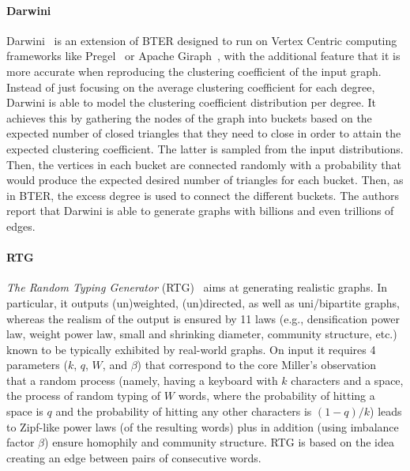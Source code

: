 \paragraph{Darwini} Darwini~\cite{edunov2016darwini} is an extension of BTER
designed to run on Vertex Centric computing frameworks like
Pregel~\cite{malewicz2010pregel} or Apache Giraph~\cite{ching2015one}, with the
additional feature that it is more accurate when reproducing the clustering
coefficient of the input graph. Instead of just focusing on the average
clustering coefficient for each degree, Darwini is able to model the clustering
coefficient distribution per degree. It achieves this by gathering the nodes
of the graph into buckets based on the expected number of closed triangles that they need
to close in order to attain the expected clustering coefficient. The latter is
sampled from the input distributions. Then, the vertices in each bucket are
connected randomly with a probability that would produce the expected
desired number of triangles for each bucket. Then, as in BTER, the excess degree
is used to connect the different buckets. The authors report that Darwini is
able to generate graphs with billions and even trillions of edges.


\paragraph{RTG} \emph{The Random Typing Generator} (RTG)~\cite{DBLP:journals/datamine/AkogluF09} aims at generating realistic graphs. In particular, it outputs (un)weighted, (un)directed, as well as uni/bipartite graphs, whereas the realism of the output is ensured by 11 laws (e.g., densification power law, weight power law, small and shrinking diameter, community structure, etc.) known to be typically exhibited by real-world graphs. On input it requires 4 parameters ($k$, $q$, $W$, and $\beta$) that correspond to the core Miller's observation~\cite{miller1957} that a random process (namely, having a keyboard with $k$ characters and a space, the process of random typing of $W$ words, where the probability of hitting a space is $q$ and the probability of hitting any other characters is $(1-q)/k$) leads to Zipf-like power laws (of the resulting words) plus in addition (using imbalance factor $\beta$) ensure homophily and community structure. RTG is based on the idea creating an edge between pairs of consecutive words.

